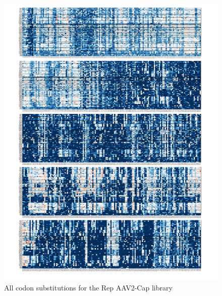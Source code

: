 \begin{figure}
\includegraphics[width=\textwidth,height=\textheight]{figures/20180903_AAV2_supp_fig3_Rep_subs.pdf} 
\caption[All codon substitutions for the Rep AAV2-Cap  library]{All codon substitutions for the Rep AAV2-Cap  library
\label{fig:Figure 8}}
\end{figure}

